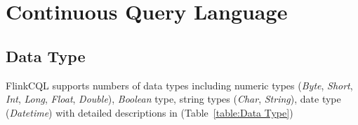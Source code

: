 

\section{Continuous Query Language} \label{language}

\subsection{Data Type}

FlinkCQL supports numbers of data types including numeric types (\textit{Byte}, \textit{Short}, \textit{Int}, \textit{Long}, \textit{Float}, \textit{Double}), \textit{Boolean}  type, string types (\textit{Char}, \textit{String}), date type (\textit{Datetime}) with detailed descriptions in (Table~\ref{table:Data Type})


